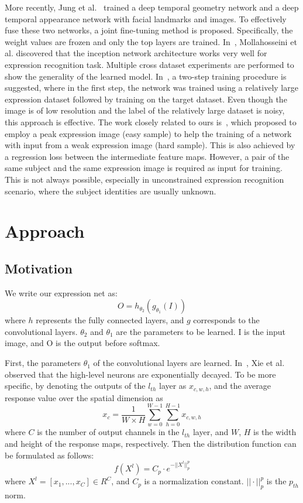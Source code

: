 \documentclass[a4paper, 10pt, conference]{ieeeconf}      %
\begin{document}
More recently, Jung et al.~\cite{jung2015deep} trained a deep temporal geometry network and a deep temporal appearance network with facial landmarks and images. To effectively fuse these two networks, a joint fine-tuning method is proposed. Specifically, the weight values are frozen and only the top layers are trained. 
In~\cite{mollahosseini2016going}, Mollahosseini et al. discovered that the inception network architecture works very well for expression recognition task. Multiple cross dataset experiments are performed to show the generality of the learned model. In~\cite{yu2015image, ng2015deep}, a two-step training procedure is suggested, where in the first step, the network was trained using a relatively large expression dataset followed by training on the target dataset. Even though the image is of low resolution and the label of the relatively large dataset is noisy, this approach is effective. The work closely related to ours is~\cite{zhao2016peak}, which proposed to employ a peak expression image (easy sample) to help the training  of a network with input from a weak expression image (hard sample). This is also achieved by a regression loss between the intermediate feature maps. However, a pair of the same subject and the same expression image is required as input for training. This is not always possible, especially in unconstrained expression recognition scenario, where the subject identities are usually unknown.  

\section{Approach}
\subsection{Motivation}
We write our expression net as:
$$O = h_{\theta_2}(g_{\theta_1}(I))$$
where $h$ represents the fully connected layers, and $g$ corresponds to the convolutional layers. $\theta_2$ and $\theta_1$ are the parameters to be learned. I is the input image, and O is the output before softmax.

First, the parameters $\theta_1$ of the convolutional layers are learned.
In~\cite{xie2016interactive}, Xie et al. observed that the high-level neurons are exponentially decayed. To be more specific, by denoting the outputs of the $l_{th}$ layer as $x_{c,w,h}$, 
and the average response value over the spatial dimension as
\begin{equation}
x_c = \frac{1}{W \times H}\sum_{w=0}^{W-1}\sum_{h=0}^{H-1}x_{c,w,h}
\end{equation}
where $C$ is the number of output channels in the $l_{th}$ layer, and $W$, $H$ is the  width and height of the response maps, respectively.
Then the distribution function can be formulated as follows: 
\begin{equation}
f(X^l) = C_p \cdot e^{-||X^l||_p^p}
\end{equation}
where $X^l = [x_1, ..., x_C] \in R^C$, and $C_p$ is a normalization constant. $||\cdot||_p^p$ is the $p_{th}$ norm. 
\end{document}
